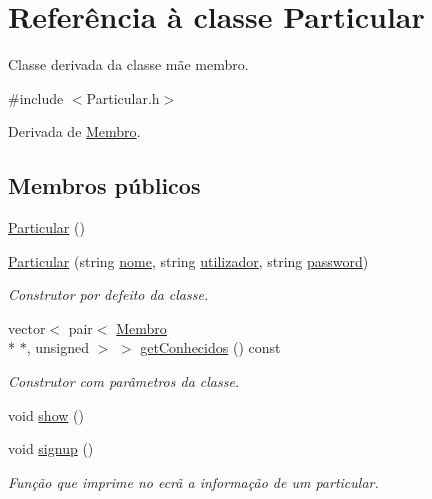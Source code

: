 \hypertarget{class_particular}{\section{Referência à classe Particular}
\label{class_particular}
}


Classe derivada da classe mãe membro.  




{\ttfamily \#include $<$Particular.\+h$>$}



Derivada de \hyperlink{class_membro}{Membro}.

\subsection*{Membros públicos}
\begin{DoxyCompactItemize}
\item 
\hyperlink{class_particular_ac348d7cd078bbc184cf12f7ac8c7e589}{Particular} ()
\item 
\hyperlink{class_particular_a00248cda34d52ac67b531ca3f71d557d}{Particular} (string \hyperlink{class_membro_a2598bbe34ae32a98f41468b2202a9555}{nome}, string \hyperlink{class_membro_a42cc733ff94ec8d1bbfdacc62dfbb0e7}{utilizador}, string \hyperlink{class_membro_ae2b12fc3e91efc674c07e735edf4ac21}{password})
\begin{DoxyCompactList}\small\item\em Construtor por defeito da classe. \end{DoxyCompactList}\item 
vector$<$ pair$<$ \hyperlink{class_membro}{Membro} \\*
$\ast$, unsigned $>$ $>$ \hyperlink{class_particular_a4449ee915348f09a2c5b96f3f8106a55}{get\+Conhecidos} () const 
\begin{DoxyCompactList}\small\item\em Construtor com parâmetros da classe. \end{DoxyCompactList}\item 
void \hyperlink{class_particular_a01235e9f582726e6068b176cd4b8795b}{show} ()
\item 
void \hyperlink{class_particular_aa8459c54108da82bb5ae21f2779c53da}{signup} ()
\begin{DoxyCompactList}\small\item\em Função que imprime no ecrã a informação de um particular. \end{DoxyCompactList}\item 

\end{DoxyCompactItemize}
